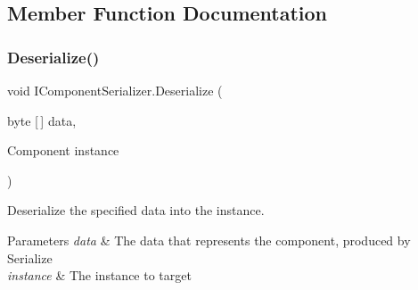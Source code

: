 \subsection{Member Function Documentation}
\mbox{\label{interface_i_component_serializer_a4cc366a5c78b33d47a90c209d8fed883}} 
\subsubsection{\texorpdfstring{Deserialize()}{Deserialize()}}
{\footnotesize\ttfamily void I\+Component\+Serializer.\+Deserialize (\begin{DoxyParamCaption}\item[{byte \mbox{[}$\,$\mbox{]}}]{data,  }\item[{Component}]{instance }\end{DoxyParamCaption})}



Deserialize the specified data into the instance. 


\begin{DoxyParams}{Parameters}
{\em data} & The data that represents the component, produced by Serialize \\
\hline
{\em instance} & The instance to target \\
\hline
\end{DoxyParams}


